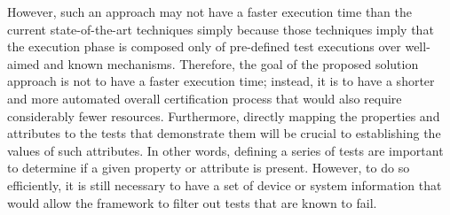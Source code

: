 However, such an approach may not have a faster execution time than the current state-of-the-art techniques simply because those techniques imply that the execution phase is composed only of pre-defined test executions over well-aimed and known mechanisms. Therefore, the goal of the proposed solution approach is not to have a faster execution time; instead, it is to have a shorter and more automated overall certification process that would also require considerably fewer resources. Furthermore, directly mapping the properties and attributes to the tests that demonstrate them will be crucial to establishing the values of such attributes. In other words, defining a series of tests are important to determine if a given property or attribute is present. However, to do so efficiently, it is still necessary to have a set of device or system information that would allow the framework to filter out tests that are known to fail.


